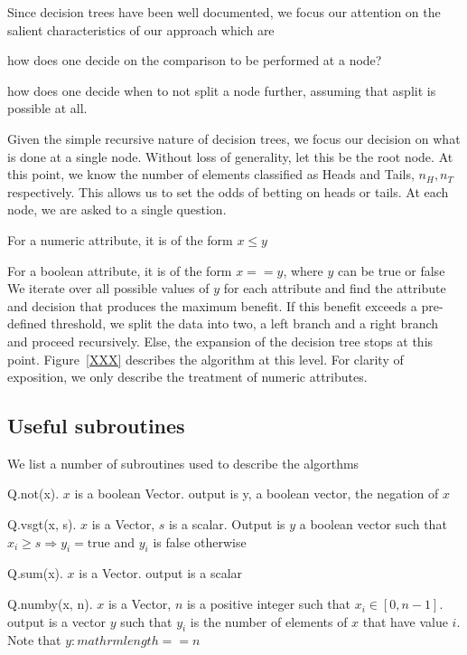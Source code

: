 Since decision trees have been well documented, we focus our attention on the
salient characteristics of our approach which are
\be
\item how does one decide on the comparison to be performed at a node?
\item how does one decide when to not split a node further, assuming that asplit
is possible at all.
\ee

Given the simple recursive nature of decision trees, we focus our 
decision on what is done at a single node. Without loss of generality, 
let this be the root node. At this point, we know the number of elements
classified as Heads and Tails, \(n_H, n_T\) respectively. This allows us to set
the odds of betting on heads or tails. At each node, we are asked to a single
question. 
\bi
\item For a numeric attribute, it is of the form \(x \leq y\)
\item For a boolean attribute, it is of the form \(x == y\), where 
\(y\) can be true or false
\ei
We iterate over all possible values of \(y\) for each attribute and find the
attribute and decision that produces the maximum benefit. If this benefit
exceeds a pre-defined threshold, we split the data into two, a left branch and a
right branch and proceed recursively. Else, the expansion of the decision tree
stops at this point.
Figure~\ref{XXX} describes the algorithm at this level. For clarity of 
exposition, we only describe the treatment of numeric attributes.


\subsection{Useful subroutines}
We list a number of subroutines used to describe the algorthms
\be
\item Q.not(x). \(x\) is a boolean Vector. output is y, a boolean vector, the
negation of \(x\)
\item Q.vsgt(x, s). \(x\) is a Vector, \(s\) is a scalar. Output is \(y\) a
boolean vector such that \(x_i \geq s \Rightarrow y_i = \mathrm{true}\) and
\(y_i\) is false otherwise
\item Q.sum(x). \(x\) is a Vector. output is a scalar
\item Q.numby(x, n). \(x\) is a Vector, \(n\) is a positive integer 
such that \(x_i \in [0, n-1]\). output is a vector \(y\) such that \(y_i\) is
the number of elements of \(x\) that have value \(i\). Note that
\(y:mathrm{length} == n\)
\ee

